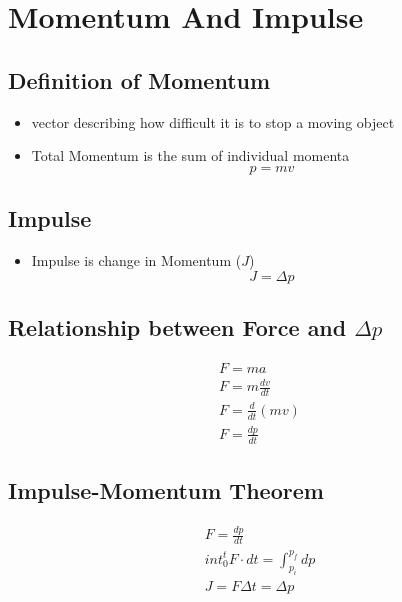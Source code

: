 \documentclass[../Notes.tex]{subfiles}
\begin{document}
    \section{Momentum And Impulse}
    
    \subsection{Definition of Momentum}
    \begin{itemize}
        \item vector describing how difficult it is to stop a moving object
        \item Total Momentum is the sum of individual momenta
        \begin{equation*}
            p = mv
        \end{equation*}
    \end{itemize}

    \subsection{Impulse}
    \begin{itemize}
        \item Impulse is change in Momentum ($J$)
        \begin{equation*}
            J = \Delta p
        \end{equation*}
    \end{itemize}

    \subsection{Relationship between Force and $\Delta p$}
    \begin{align*}
        F = ma \\
        F = m \frac{dv}{dt} \\
        F = \frac{d}{dt}(mv) \\
        F = \frac{dp}{dt}
    \end{align*}

    \subsection{Impulse-Momentum Theorem}
    \begin{align*}
        F = \frac{dp}{dt} \\
        int_0^t F \cdot dt = \int_{p_i}^{p_f} dp \\
        J = F \Delta t = \Delta p
    \end{align*}
\end{document}
